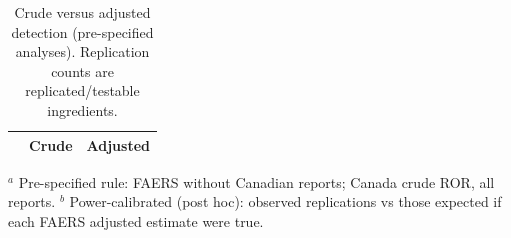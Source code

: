 \documentclass[11pt]{article}
\begin{document}


\begin{table}[t]
\centering\small
\caption{Crude versus adjusted detection (pre-specified analyses). Replication counts are replicated/testable ingredients.}
\label{tab:methods}
\begin{tabular}{p{8.6cm}cc}
\toprule
 & Crude & Adjusted \\
\midrule

\bottomrule
\end{tabular}

\smallskip
\raggedright\footnotesize $^a$ Pre-specified rule: FAERS without Canadian reports; Canada crude ROR, all reports.
$^b$ Power-calibrated (post hoc): observed replications vs those expected if each FAERS adjusted estimate were true.
\end{table}

\begin{table}[t]
\centering\small
\caption{Post-hoc analyses: extended indication filter, Canada Vigilance without solicited reports, both estimates adjusted,
with four ways of handling ototoxic co-medication and a restriction of Canada Vigilance to reports from 2004. Fisher $p$:
unlabelled vs background replication. O/E: observed/expected replications (adjusted counts). Robust: adjusted signals replicated
adjusted-to-adjusted (unlabelled in brackets).}
\label{tab:posthoc}
\end{table}

\begin{table}[t]
\centering\small
\caption{Previously reported FAERS hearing-loss signals re-tested here (FAERS without Canadian reports). Columns: reported,
crude signal, adjusted signal, adjusted and testable in Canada, adjusted and replicated, robust (post hoc).}
\label{tab:prior}
\end{table}
\end{document}
